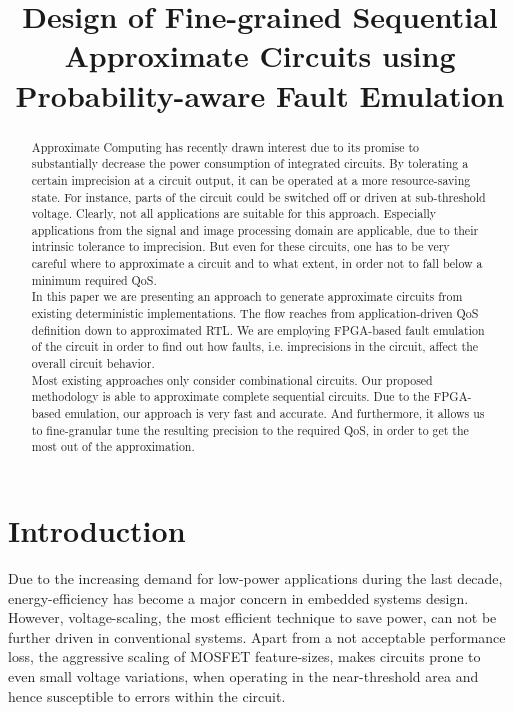 \documentclass[conference]{IEEEtran}
\begin{document}
\title{Design of Fine-grained Sequential Approximate Circuits using Probability-aware Fault Emulation}


\author{
\IEEEauthorblockA{}
\and
{}
\IEEEauthorblockA{}
}


\maketitle


\begin{abstract}
Approximate Computing has recently drawn interest due to its promise to substantially decrease the power consumption of integrated circuits. By tolerating a certain imprecision at a circuit output, it can be operated at a more resource-saving state. For instance, parts of the circuit could be switched off or driven at sub-threshold voltage. Clearly, not all applications are suitable for this approach. Especially applications from the signal and image processing domain are applicable, due to their intrinsic tolerance to imprecision. But even for these circuits, one has to be very careful where to approximate a circuit and to what extent, in order not to fall below a minimum required QoS.\\
In this paper we are presenting an approach to generate approximate circuits from existing deterministic implementations. The flow reaches from application-driven QoS definition down to approximated RTL. We are employing FPGA-based fault emulation of the circuit in order to find out how faults, i.e. imprecisions in the circuit, affect the overall circuit behavior.\\
Most existing approaches only consider combinational circuits. Our proposed methodology is able to approximate complete sequential circuits. Due to the FPGA-based emulation, our approach is very fast and accurate. And furthermore, it allows us to fine-granular tune the resulting precision to the required QoS, in order to get the most out of the approximation.
\end{abstract}

\IEEEpeerreviewmaketitle



\section{Introduction}
Due to the increasing demand for low-power applications during the last decade, energy-efficiency has become a major concern in embedded systems design. However, voltage-scaling, the most efficient technique to save power, can not be further driven in conventional systems. Apart from a not acceptable performance loss, the aggressive scaling of \mbox{MOSFET} feature-sizes, makes circuits prone to even small voltage variations, when operating in the near-threshold area and hence susceptible to errors within the circuit.
\end{document}
